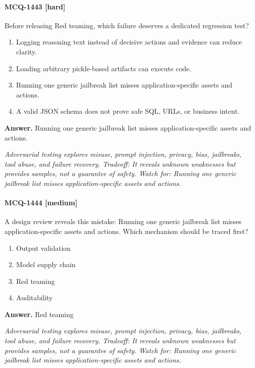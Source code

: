\paragraph{MCQ-1443 [hard]} Before releasing Red teaming, which failure deserves a dedicated regression test?
\begin{enumerate}[label=\Alph*.]
\item Logging reasoning text instead of decisive actions and evidence can reduce clarity.
\item Loading arbitrary pickle-based artifacts can execute code.
\item Running one generic jailbreak list misses application-specific assets and actions.
\item A valid JSON schema does not prove safe SQL, URLs, or business intent.
\end{enumerate}
\noindent\textbf{Answer.} Running one generic jailbreak list misses application-specific assets and actions.
\par\textit{Adversarial testing explores misuse, prompt injection, privacy, bias, jailbreaks, tool abuse, and failure recovery. Tradeoff: It reveals unknown weaknesses but provides samples, not a guarantee of safety. Watch for: Running one generic jailbreak list misses application-specific assets and actions.}
\paragraph{MCQ-1444 [medium]} A design review reveals this mistake: Running one generic jailbreak list misses application-specific assets and actions. Which mechanism should be traced first?
\begin{enumerate}[label=\Alph*.]
\item Output validation
\item Model supply chain
\item Red teaming
\item Auditability
\end{enumerate}
\noindent\textbf{Answer.} Red teaming
\par\textit{Adversarial testing explores misuse, prompt injection, privacy, bias, jailbreaks, tool abuse, and failure recovery. Tradeoff: It reveals unknown weaknesses but provides samples, not a guarantee of safety. Watch for: Running one generic jailbreak list misses application-specific assets and actions.}
